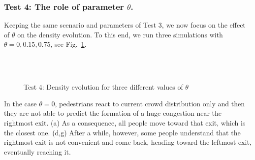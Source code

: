 \documentclass{cmslatex}
\begin{document}
\subsubsection{Test 4: The role of parameter $\theta$.}
Keeping the same scenario and parameters of Test 3, we now focus on the effect of $\theta$ on the density evolution.
To this end, we run three simulations with $\theta=0, 0.15, 0.75$, see Fig.\ \ref{fig:test4}.
%
\begin{figure}[h!]
\centering
\hspace{0 mm}
\hspace{0 mm}
\\
\vspace{0 mm}
\hspace{0 mm}
\hspace{0 mm}
\\
\vspace{0 mm}
\hspace{0 mm}
\hspace{0 mm}
\caption{Test 4: Density evolution for three different values of $\theta$}
\label{fig:test4}
\end{figure}
%
In the case $\theta=0$, pedestrians react to current crowd distribution only and then they are not able to predict the formation of a huge congestion near the rightmost exit. (a) As a consequence, all people move toward that exit, which is the closest one. (d,g) After a while, however, some people understand that the rightmost exit is not convenient and come back, heading toward the leftmost exit, eventually reaching it.
\end{document}
